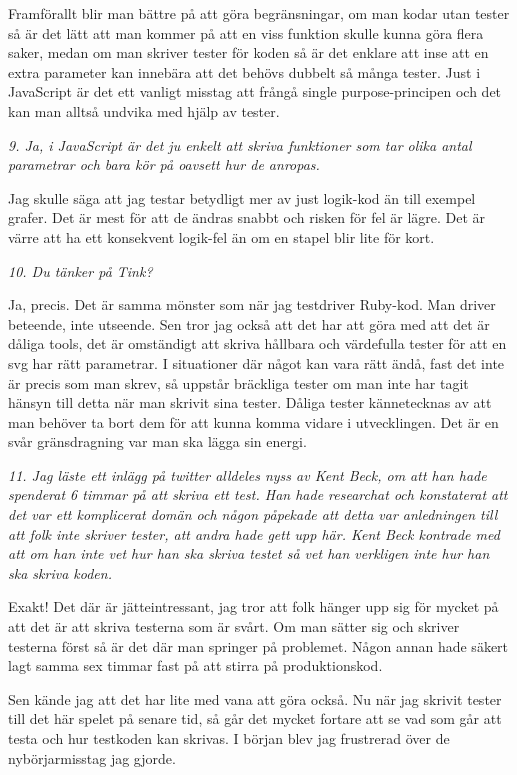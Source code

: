 \documentclass[11pt]{article}
\begin{document}
Framförallt blir man bättre på att göra begränsningar, om man kodar utan tester så är det lätt att man kommer på att en viss funktion skulle kunna göra flera saker, medan om man skriver tester för koden så är det enklare att inse att en extra parameter kan innebära att det behövs dubbelt så många tester. Just i JavaScript är det ett vanligt misstag att frångå single purpose-principen och det kan man alltså undvika med hjälp av tester.

\emph{9. Ja, i JavaScript är det ju enkelt att skriva funktioner som tar olika antal parametrar och bara kör på oavsett hur de anropas.}

Jag skulle säga att jag testar betydligt mer av just logik-kod än till exempel grafer. Det är mest för att de ändras snabbt och risken för fel är lägre. Det är värre att ha ett konsekvent logik-fel än om en stapel blir lite för kort.

\emph{10. Du tänker på Tink?}

Ja, precis. Det är samma mönster som när jag testdriver Ruby-kod. Man driver beteende, inte utseende. Sen tror jag också att det har att göra med att det är dåliga tools, det är omständigt att skriva hållbara och värdefulla tester för att en svg har rätt parametrar. I situationer där något kan vara rätt ändå, fast det inte är precis som man skrev, så uppstår bräckliga tester om man inte har tagit hänsyn till detta när man skrivit sina tester. Dåliga tester kännetecknas av att man behöver ta bort dem för att kunna komma vidare i utvecklingen. Det är en svår gränsdragning var man ska lägga sin energi.

\emph{11. Jag läste ett inlägg på twitter alldeles nyss av Kent Beck, om att han hade spenderat 6 timmar på att skriva ett test. Han hade researchat och konstaterat att det var ett komplicerat domän och någon påpekade att detta var anledningen till att folk inte skriver tester, att andra hade gett upp här. Kent Beck kontrade med att om han inte vet hur han ska skriva testet så vet han verkligen inte hur han ska skriva koden.}

Exakt! Det där är jätteintressant, jag tror att folk hänger upp sig för mycket på att det är att skriva testerna som är svårt. Om man sätter sig och skriver testerna först så är det där man springer på problemet. Någon annan hade säkert lagt samma sex timmar fast på att stirra på produktionskod.

Sen kände jag att det har lite med vana att göra också. Nu när jag skrivit tester till det här spelet på senare tid, så går det mycket fortare att se vad som går att testa och hur testkoden kan skrivas. I början blev jag frustrerad över de nybörjarmisstag jag gjorde.
\end{document}
